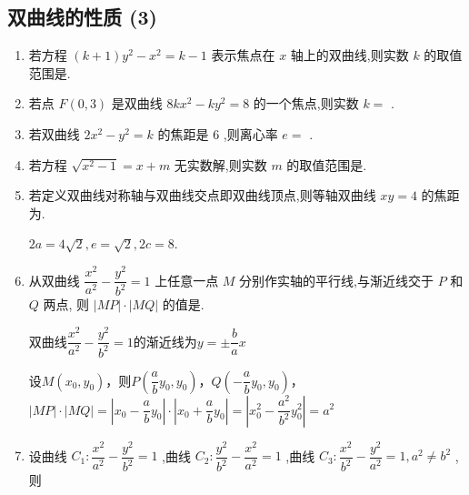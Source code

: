\subsection*{双曲线的性质 (3)}
\begin{enumerate}
    \item 若方程 $\left( {k + 1}\right) {y}^{2} - {x}^{2} = k - 1$ 表示焦点在 $x$ 轴上的双曲线,则实数 $k$ 的取值范围是.

    \item 若点 $F\left( {0,3}\right)$ 是双曲线 ${8k}{x}^{2} - k{y}^{2} = 8$ 的一个焦点,则实数 $k =$ .

    \item 若双曲线 $2{x}^{2} - {y}^{2} = k$ 的焦距是 6 ,则离心率 ${e} =$ .

    \item 若方程 $\sqrt{{x}^{2} - 1} = x + m$ 无实数解,则实数 $m$ 的取值范围是.

    \item 若定义双曲线对称轴与双曲线交点即双曲线顶点,则等轴双曲线 ${xy} = 4$ 的焦距为.
    \begin{jieda}
        $2a = 4\sqrt{2}, e = \sqrt{2}, 2c = 8$.
    \end{jieda}

    \item 从双曲线 $\dfrac{{x}^{2}}{{a}^{2}} - \dfrac{{y}^{2}}{{b}^{2}} = 1$ 上任意一点 ${M}$ 分别作实轴的平行线,与渐近线交于 ${P}$ 和 ${Q}$ 两点, 则 $\left| {MP}\right|  \cdot  \left| {MQ}\right|$ 的值是.
    \begin{jieda}
        双曲线$\dfrac{{x}^{2}}{{a}^{2}} - \dfrac{{y}^{2}}{{b}^{2}} = 1$的渐近线为$y = \pm \dfrac{b}{a}x$
    
        设$M(x_0, y_0)$，则$P\left(\dfrac{a}{b}y_0, y_0\right)$，$Q\left(-\dfrac{a}{b}y_0, y_0\right)$，$|MP| \cdot |MQ| = \left|x_0 - \dfrac{a}{b}y_0\right| \cdot \left|x_0 + \dfrac{a}{b}y_0\right| = \left|x_0^2 - \dfrac{a^2}{b^2}y_0^2\right| = a^2$
    \end{jieda}

    \item 设曲线 ${C}_{1} : \dfrac{{x}^{2}}{{a}^{2}} - \dfrac{{y}^{2}}{{b}^{2}} = 1$ ,曲线 ${C}_{2} : \dfrac{{y}^{2}}{{b}^{2}} - \dfrac{{x}^{2}}{{a}^{2}} = 1$ ,曲线 ${C}_{3} : \dfrac{{x}^{2}}{{b}^{2}} - \dfrac{{y}^{2}}{{a}^{2}} = 1,{a}^{2} \neq  {b}^{2}$ ,则
    

\end{enumerate}
